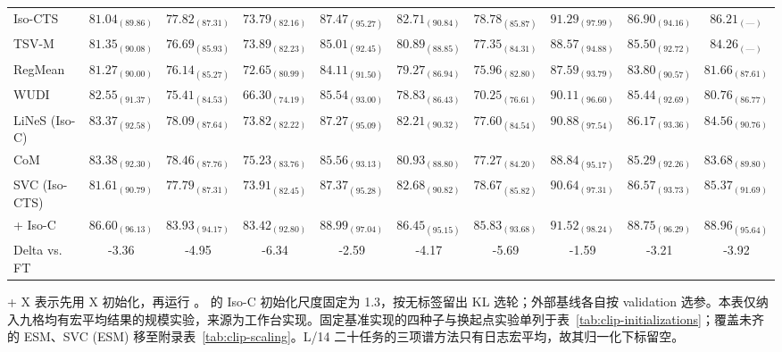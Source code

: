 \begin{table}[!htbp]
{\begin{tabular}{@{}lccc|ccc|ccc@{}}
Iso-CTS & $81.04_{(89.86)}$ & $77.82_{(87.31)}$ & $73.79_{(82.16)}$ & $87.47_{(95.27)}$ & $82.71_{(90.84)}$ & $78.78_{(85.87)}$ & $91.29_{(97.99)}$ & $86.90_{(94.16)}$ & $86.21_{(\text{---})}$ \\
TSV-M & $81.35_{(90.08)}$ & $76.69_{(85.93)}$ & $73.89_{(82.23)}$ & $85.01_{(92.45)}$ & $80.89_{(88.85)}$ & $77.35_{(84.31)}$ & $88.57_{(94.88)}$ & $85.50_{(92.72)}$ & $84.26_{(\text{---})}$ \\
RegMean & $81.27_{(90.00)}$ & $76.14_{(85.27)}$ & $72.65_{(80.99)}$ & $84.11_{(91.50)}$ & $79.27_{(86.94)}$ & $75.96_{(82.80)}$ & $87.59_{(93.79)}$ & $83.80_{(90.57)}$ & $81.66_{(87.61)}$ \\
WUDI & $82.55_{(91.37)}$ & $75.41_{(84.53)}$ & $66.30_{(74.19)}$ & $85.54_{(93.00)}$ & $78.83_{(86.43)}$ & $70.25_{(76.61)}$ & $90.11_{(96.60)}$ & $85.44_{(92.69)}$ & $80.76_{(86.77)}$ \\
LiNeS (Iso-C) & $83.37_{(92.58)}$ & $78.09_{(87.64)}$ & $73.82_{(82.22)}$ & $87.27_{(95.09)}$ & $82.21_{(90.32)}$ & $77.60_{(84.54)}$ & $90.88_{(97.54)}$ & $86.17_{(93.36)}$ & $84.56_{(90.76)}$ \\
CoM & $83.38_{(92.30)}$ & $78.46_{(87.76)}$ & $75.23_{(83.76)}$ & $85.56_{(93.13)}$ & $80.93_{(88.80)}$ & $77.27_{(84.20)}$ & $88.84_{(95.17)}$ & $85.29_{(92.26)}$ & $83.68_{(89.80)}$ \\
SVC (Iso-CTS) & $81.61_{(90.79)}$ & $77.79_{(87.31)}$ & $73.91_{(82.45)}$ & $87.37_{(95.28)}$ & $82.68_{(90.82)}$ & $78.67_{(85.82)}$ & $90.64_{(97.31)}$ & $86.57_{(93.73)}$ & $85.37_{(91.69)}$ \\
\rowcolor{black!8}
\method{} + Iso-C & $86.60_{(96.13)}$ & $83.93_{(94.17)}$ & $83.42_{(92.80)}$ & $88.99_{(97.04)}$ & $86.45_{(95.15)}$ & $85.83_{(93.68)}$ & $91.52_{(98.24)}$ & $88.75_{(96.29)}$ & $88.96_{(95.64)}$ \\
Delta vs. FT & -3.36 & -4.95 & -6.34 & -2.59 & -4.17 & -5.69 & -1.59 & -3.21 & -3.92 \\
\bottomrule
\end{tabular}}
\par\smallskip
{\footnotesize \method{} + X 表示先用 X 初始化，再运行 \method{}。\method{} 的 Iso-C 初始化尺度固定为 1.3，按无标签留出 KL 选轮；外部基线各自按 validation 选参。本表仅纳入九格均有宏平均结果的规模实验，来源为工作台实现。固定基准实现的四种子与换起点实验单列于表~\ref{tab:clip-initializations}；覆盖未齐的 ESM、SVC (ESM) 移至附录表~\ref{tab:clip-scaling}。L/14 二十任务的三项谱方法只有日志宏平均，故其归一化下标留空。}
\end{table}
